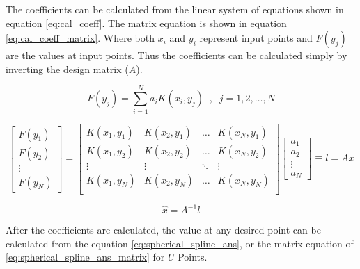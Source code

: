 \documentclass[12pt]{article}
\begin{document}
	The coefficients can be calculated from the linear system of equations shown in equation \ref{eq:cal_coeff}. The matrix equation is shown in equation \ref{eq:cal_coeff_matrix}. Where both $x_i$ and $y_i$ represent input points and $F(y_j)$ are the values at input points. Thus the coefficients can be calculated simply by inverting the design matrix ($A$).
	
	\begin{equation}
		F(y_j) = \sum_{i=1}^{N}a_iK(x_i,y_j) \;\;,\;\; j=1,2,\dots,N
		\label{eq:cal_coeff}
	\end{equation}
	
	\begin{equation}
		\begin{bmatrix}
			F(y_1) \\ F(y_2) \\ \vdots \\ F(y_N) 
		\end{bmatrix}
		= 
		\begin{bmatrix}
			K(x_1,y_1) & K(x_2,y_1) & \dots & K(x_N,y_1) \\
			K(x_1,y_2) & K(x_2,y_2) & \dots & K(x_N,y_2) \\
			\vdots & \vdots & \ddots & \vdots \\
			K(x_1,y_N) & K(x_2,y_N) & \dots & K(x_N,y_N) \\
		\end{bmatrix}
		\begin{bmatrix}
			a_1 \\ a_2 \\ \vdots \\ a_N
		\end{bmatrix}
		\equiv l = Ax
		\label{eq:cal_coeff_matrix}
	\end{equation}
	
	\begin{equation}
		\hat{x}=A^{-1}l
	\end{equation}
	
	After the coefficients are calculated, the value at any desired point can be calculated from the equation \ref{eq:spherical_spline_ans}, or the matrix equation of \ref{eq:spherical_spline_ans_matrix} for $U$ Points.
	
\end{document}
